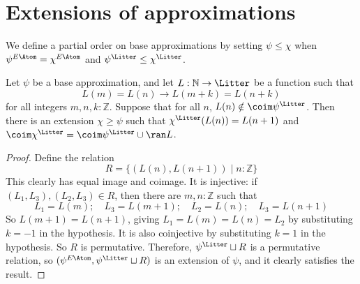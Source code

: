 \section{Extensions of approximations}
\begin{definition}
  \label{def:BaseApprox.LE}
  \leanok
  We define a partial order on base approximations by setting \( \psi \leq \chi \) when \( \psi^{E\Atom} = \chi^{E\Atom} \) and \( \psi^\Litter \leq \chi^\Litter \).
\end{definition}
\begin{proposition}
  \label{prop:BaseApprox.addOrbit}
  \leanok
  Let \( \psi \) be a base approximation, and let \( L : \mathbb N \to \Litter \) be a function such that
  \[ L(m) = L(n) \to L(m+k) = L(n+k) \]
  for all integers \( m, n, k : \mathbb Z \).
  Suppose that for all \( n \), \( L(n) \notin \coim \psi^\Litter \).
  Then there is an extension \( \chi \geq \psi \) such that \( \chi^\Litter(L(n)) = L(n+1) \) and \( \coim \chi^\Litter = \coim \psi^\Litter \cup \ran L \).
\end{proposition}
\begin{proof}
  \leanok
  Define the relation
  \[ R = \{ (L(n), L(n+1)) \mid n : \mathbb Z \} \]
  This clearly has equal image and coimage.
  It is injective: if \( (L_1, L_3), (L_2, L_3) \in R \), then there are \( m, n : \mathbb Z \) such that
  \[ L_1 = L(m);\quad L_3 = L(m + 1);\quad L_2 = L(n);\quad L_3 = L(n + 1) \]
  So \( L(m + 1) = L(n + 1) \), giving \( L_1 = L(m) = L(n) = L_2 \) by substituting \( k = -1 \) in the hypothesis.
  It is also coinjective by substituting \( k = 1 \) in the hypothesis.
  So \( R \) is permutative.
  Therefore, \( \psi^\Litter \sqcup R \) is a permutative relation, so \( (\psi^{E\Atom}, \psi^\Litter \sqcup R) \) is an extension of \( \psi \), and it clearly satisfies the result.
\end{proof}

